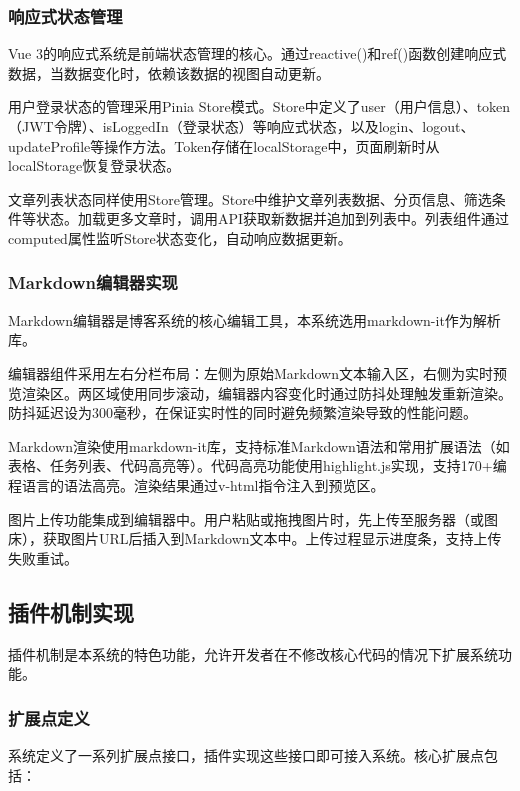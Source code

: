 \documentclass[UTF8,AutoFakeBold=1,AutoFakeSlant,zihao=-4]{SCAU}
\begin{document}
 \subsubsection{响应式状态管理}

 Vue 3的响应式系统是前端状态管理的核心{\citep{曾广海2016}}。通过reactive()和ref()函数创建响应式数据，当数据变化时，依赖该数据的视图自动更新。

 用户登录状态的管理采用Pinia Store模式。Store中定义了user（用户信息）、token（JWT令牌）、isLoggedIn（登录状态）等响应式状态，以及login、logout、updateProfile等操作方法。Token存储在localStorage中，页面刷新时从localStorage恢复登录状态。

 文章列表状态同样使用Store管理。Store中维护文章列表数据、分页信息、筛选条件等状态。加载更多文章时，调用API获取新数据并追加到列表中。列表组件通过computed属性监听Store状态变化，自动响应数据更新。

 \subsubsection{Markdown编辑器实现}

 Markdown编辑器是博客系统的核心编辑工具，本系统选用markdown-it作为解析库。

 编辑器组件采用左右分栏布局：左侧为原始Markdown文本输入区，右侧为实时预览渲染区。两区域使用同步滚动，编辑器内容变化时通过防抖处理触发重新渲染。防抖延迟设为300毫秒，在保证实时性的同时避免频繁渲染导致的性能问题。

 Markdown渲染使用markdown-it库，支持标准Markdown语法和常用扩展语法（如表格、任务列表、代码高亮等）。代码高亮功能使用highlight.js实现，支持170+编程语言的语法高亮。渲染结果通过v-html指令注入到预览区。

 图片上传功能集成到编辑器中。用户粘贴或拖拽图片时，先上传至服务器（或图床），获取图片URL后插入到Markdown文本中。上传过程显示进度条，支持上传失败重试。

 \subsection{插件机制实现}

 插件机制是本系统的特色功能，允许开发者在不修改核心代码的情况下扩展系统功能。

 \subsubsection{扩展点定义}

 系统定义了一系列扩展点接口，插件实现这些接口即可接入系统。核心扩展点包括：
\end{document}
